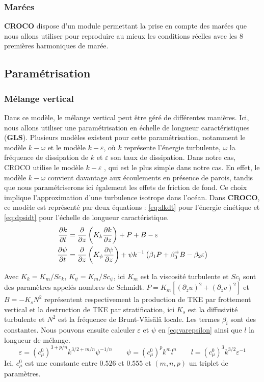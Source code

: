 \subsubsection{Marées}
\textbf{CROCO} dispose d'un module permettant la prise en compte des marées que nous allons utiliser pour reproduire au mieux les conditions réelles avec les 8 premières harmoniques de marée.

\subsection{Paramétrisation}
\subsubsection{Mélange vertical}
Dans ce modèle, le mélange vertical peut être géré de différentes manières. Ici, nous allons utiliser une paramétrisation en échelle de longueur caractéristiques (\textbf{GLS}). Plusieurs modèles existent pour cette paramétrisation, notamment le modèle $k-\omega$ et le modèle $k-\varepsilon$, où $k$ représente l'énergie turbulente, $\omega$ la fréquence de dissipation de $k$ et $\varepsilon$ son taux de dissipation. Dans notre cas, CROCO utilise le modèle $k-\varepsilon$ \cite{launder_numerical_1974}, qui est le plus simple dans notre cas. En effet, le modèle $k - \omega$ convient davantage aux écoulements en présence de parois, tandis que nous paramétriserons ici également les effets de friction de fond. Ce choix implique l'approximation d'une turbulence isotrope dans l'océan. Dans \textbf{CROCO}, ce modèle est représenté par deux équations : \autoref{eq:dkdt} pour l'énergie cinétique et \autoref{eq:dpsidt} pour l'échelle de longueur caractéristique.
\begin{subequations}
	\begin{align}
		\frac{\partial k}{\partial t} & = \frac{\partial }{\partial z} \left( K_k \frac{\partial k}{\partial z} \right) + P + B - \varepsilon \label{eq:dkdt} \\
		\frac{\partial \psi}{\partial t} & = \frac{\partial }{\partial z} \left( K_\psi \frac{\partial \psi}{\partial z} \right) + \psi k^{-1} \left( \beta_1 P + \beta_3^\pm B - \beta_2 \varepsilon \right) \label{eq:dpsidt}
	\end{align}
\end{subequations}

Avec $K_k = K_m / Sc_k$, $K_\psi = K_m / Sc_\psi$, ici $K_m$ est la viscosité turbulente et $Sc_i$ sont des paramètres appelés nombres de Schmidt. $P = K_m \left[ (\partial_z u)^2 + (\partial_z v)^2 \right]$ et $B = - K_s N^2$ représentent respectivement la production de TKE par frottement vertical et la destruction de TKE par stratification, ici $K_s$ est la diffusivité turbulente et $N^2$ est la fréquence de Brunt-Väisälä locale. Les termes $\beta_i$ sont des constantes. Nous pouvons ensuite calculer $\varepsilon$ et $\psi$ en \autoref{eq:varepsilon} ainsi que $l$ la longueur de mélange.
\begin{equation} \label{eq:varepsilon}
	\varepsilon = (c_\mu^0)^{3+p/n} k^{3/2+m/n} \psi^{-1/n} \qquad \psi = (c_\mu^0)^p k^m l^n \qquad  l = (c_\mu^0)^{3} k^{3/2} \varepsilon^{-1}
\end{equation}
Ici, $c_\mu^0$ est une constante entre $0.526$ et $0.555$ et $(m,n,p)$ un triplet de paramètres.

